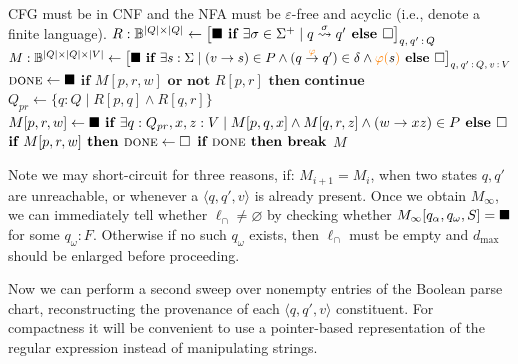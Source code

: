 \documentclass[sigplan,acmsmall,nonacm,screen]{acmart}\settopmatter{printfolios=false,printccs=false,printacmref=false}
\begin{document}
\begin{algorithm}[H]
\caption{\texttt{cfl\_fixpt} pseudocode}
\label{alg:cfl_fixpt}
\begin{algorithmic}[1]
\Require CFG must be in CNF and the NFA must be $\varepsilon$-free and acyclic (i.e., denote a finite language).
\State $R: \mathbb{B}^{|Q|\times |Q|} \gets \big[\blacksquare \textbf{ if } \exists \sigma \in \Sigma^+ \mid q \overset{\sigma}{\rightsquigarrow} q' \textbf{ else } \square\big]_{q,\,q'\,:\, Q}$ 
\State $M: \mathbb{B}^{|Q|\times |Q| \times |V|} \gets \big[\blacksquare \textbf{ if } \exists s: \Sigma \mid (v \rightarrow s) \in P \land (q \overset{{\color{orange}\varphi}}{\rightarrow} q') \in \delta \land {\color{orange}\varphi(}s{\color{orange})} \textbf{ else } \square\big]_{q,\,q'\,:\,Q,\,v\,:\,V}$
 
\State $\textsc{done} \gets \blacksquare$
 
  \State $\textbf{if } M[p, r, w] \textbf{ or not } R[p, r] \textbf{ then continue}$
  \State $Q_{pr} \gets \big\{q: Q \mid R[p, q] \land R[q, r]\big\}$ 
  \State $M[p, r, w] \gets \blacksquare \textbf{ if } \exists q: Q_{pr}, x, z: V \mid M[p, q, x] \land M[q, r, z] \land (w \rightarrow x z) \in P \textbf { else } \square$
  \State $\textbf{if } M[p, r, w] \textbf{ then } \textsc{done} \gets \square$
\EndFor
\State $\textbf{if }\textsc{done} \textbf{ then break}$
\EndFor
\State \Return $M$ 
  \end{algorithmic}
\end{algorithm}\vspace{-0.2cm}

\noindent Note we may short-circuit for three reasons, if: $M_{i+1} = M_i$, when two states $q, q'$ are unreachable, or whenever a $\langle q, q', v\rangle$ is already present. Once we obtain $M_\infty$, we can immediately tell whether $\ell_\cap \neq \varnothing$ by checking whether $M_\infty[q_\alpha, q_\omega, S] = \blacksquare$ for some $q_\omega: F$. Otherwise if no such $q_\omega$ exists, then $\ell_\cap$ must be empty and $d_\max$ should be enlarged before proceeding.

\noindent Now we can perform a second sweep over nonempty entries of the Boolean parse chart, reconstructing the provenance of each $\langle q, q', v\rangle$ constituent. For compactness it will be convenient to use a pointer-based representation of the regular expression instead of manipulating strings.
\end{document}
